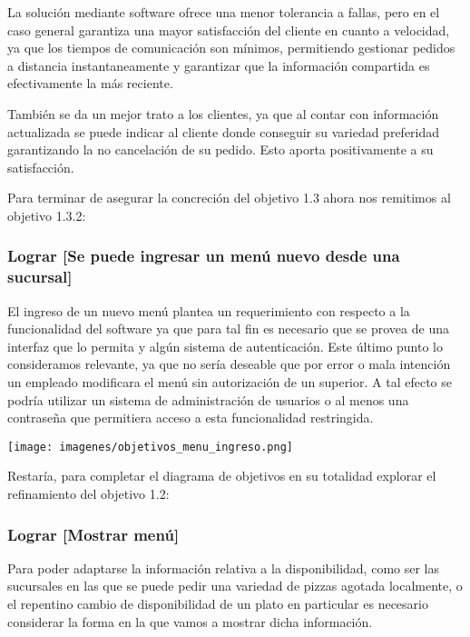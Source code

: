 \documentclass[a4paper,10pt]{article}
\begin{document}
La solución mediante software ofrece una menor tolerancia a fallas, pero en el caso general garantiza una mayor satisfacción del cliente en cuanto a velocidad, ya que los tiempos de comunicación son mínimos, permitiendo gestionar pedidos a distancia instantaneamente y garantizar que la información compartida es efectivamente la más reciente.

También se da un mejor trato a los clientes, ya que al contar con información actualizada se puede indicar al cliente donde conseguir su variedad preferidad garantizando la no cancelación de su pedido. Esto aporta positivamente a su satisfacción.



Para terminar de asegurar la concreción del objetivo 1.3 ahora nos remitimos al objetivo 1.3.2:
\subsubsection*{Lograr [Se puede ingresar un menú nuevo desde una sucursal]}
El ingreso de un nuevo menú plantea un requerimiento con respecto a la funcionalidad del software ya que para tal fin es necesario que se provea de una interfaz que lo permita y algún sistema de autenticación. Este último punto lo consideramos relevante, ya que no sería deseable que por error o mala intención un empleado modificara el menú sin autorización de un superior. A tal efecto se podría utilizar un sistema de administración de usuarios o al menos una contraseña que permitiera acceso a esta funcionalidad restringida.

\texttt{[image: imagenes/objetivos\_menu\_ingreso.png]}

Restaría, para completar el diagrama de objetivos en su totalidad explorar el refinamiento del objetivo 1.2:
\subsubsection*{Lograr [Mostrar menú]}
Para poder adaptarse la información relativa a la disponibilidad, como ser las sucursales en las que se puede pedir una variedad de pizzas agotada localmente, o el repentino cambio de disponibilidad de un plato en particular es necesario considerar la forma en la que vamos a mostrar dicha información.
\end{document}
